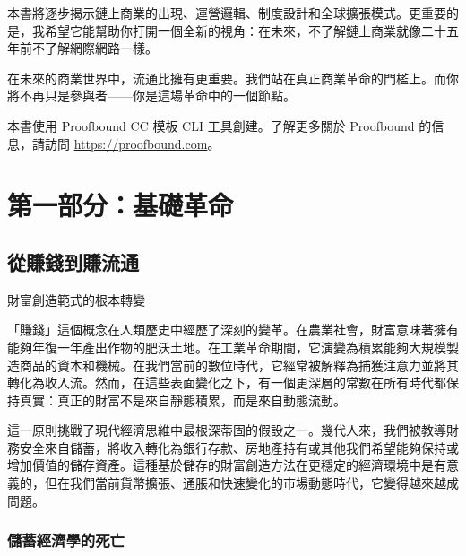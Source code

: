 \documentclass[
  Letterpaper,
]{scrbook}
\begin{document}
本書將逐步揭示鏈上商業的出現、運營邏輯、制度設計和全球擴張模式。更重要的是，我希望它能幫助你打開一個全新的視角：在未來，不了解鏈上商業就像二十五年前不了解網際網路一樣。

在未來的商業世界中，流通比擁有更重要。我們站在真正商業革命的門檻上。而你將不再只是參與者------你是這場革命中的一個節點。

\begin{tcolorbox}[enhanced jigsaw, titlerule=0mm, bottomrule=.15mm, bottomtitle=1mm, coltitle=black, opacitybacktitle=0.6, title=\textcolor{quarto-callout-note-color}{\faInfo}\hspace{0.5em}{關於本書}, colframe=quarto-callout-note-color-frame, opacityback=0, toptitle=1mm, rightrule=.15mm, arc=.35mm, colbacktitle=quarto-callout-note-color!10!white, colback=white, breakable, toprule=.15mm, leftrule=.75mm, left=2mm]

本書使用 Proofbound CC 模板 CLI 工具創建。了解更多關於 Proofbound
的信息，請訪問 \url{https://proofbound.com}。

\end{tcolorbox}

\part{第一部分：基礎革命}

\chapter{從賺錢到賺流通}\label{sec-earning-circulation}

財富創造範式的根本轉變

「賺錢」這個概念在人類歷史中經歷了深刻的變革。在農業社會，財富意味著擁有能夠年復一年產出作物的肥沃土地。在工業革命期間，它演變為積累能夠大規模製造商品的資本和機械。在我們當前的數位時代，它經常被解釋為捕獲注意力並將其轉化為收入流。然而，在這些表面變化之下，有一個更深層的常數在所有時代都保持真實：真正的財富不是來自靜態積累，而是來自動態流動。

這一原則挑戰了現代經濟思維中最根深蒂固的假設之一。幾代人來，我們被教導財務安全來自儲蓄，將收入轉化為銀行存款、房地產持有或其他我們希望能夠保持或增加價值的儲存資產。這種基於儲存的財富創造方法在更穩定的經濟環境中是有意義的，但在我們當前貨幣擴張、通脹和快速變化的市場動態時代，它變得越來越成問題。

\section{儲蓄經濟學的死亡}\label{ux5132ux84c4ux7d93ux6fdfux5b78ux7684ux6b7bux4ea1}
\end{document}
